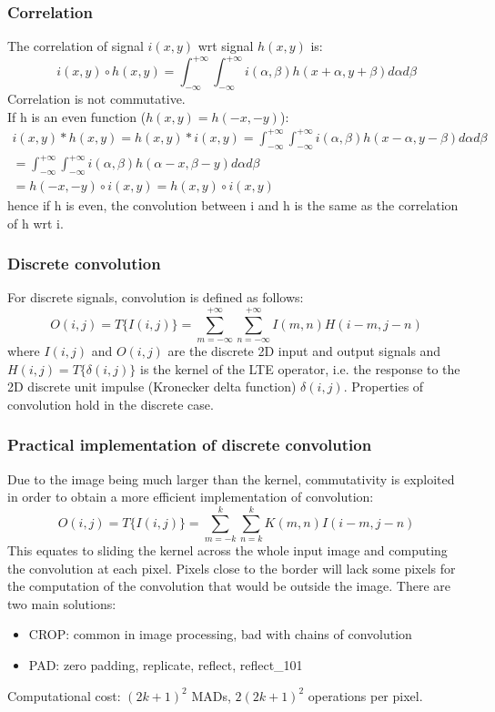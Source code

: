 \documentclass{article}
\begin{document}
\subsubsection{Correlation}
The correlation of signal $i(x,y)$ wrt signal $h(x,y)$ is:
$$i(x,y)\circ h(x,y) = \int_{-\infty}^{+\infty} \int_{-\infty}^{+\infty} i(\alpha,\beta)h(x+\alpha,y+\beta)d\alpha d\beta$$
Correlation is not commutative.\\
If h is an even function ($h(x,y)=h(-x,-y)$):
\begin{gather*}
    i(x,y)*h(x,y)=h(x,y)*i(x,y)=\int_{-\infty}^{+\infty} \int_{-\infty}^{+\infty} i(\alpha,\beta)h(x-\alpha,y-\beta)d\alpha d\beta\\
    = \int_{-\infty}^{+\infty} \int_{-\infty}^{+\infty} i(\alpha,\beta)h(\alpha-x,\beta-y)d\alpha d\beta\\
    = h(-x,-y)\circ i(x,y) = h(x,y) \circ i(x,y)
\end{gather*}
hence if h is even, the convolution between i and h is the same as the correlation of h wrt i.
\subsubsection{Discrete convolution}
For discrete signals, convolution is defined as follows:
\begin{equation}
    O(i,j)=T\{I(i,j)\}=\sum_{m=-\infty}^{+\infty} \sum_{n=-\infty}^{+\infty} I(m,n)H(i-m,j-n)
\end{equation}
where $I(i,j)$ and $O(i,j)$ are the discrete 2D input and output signals and $H(i,j)=T\{\delta(i,j)\}$ is the kernel of the LTE operator, i.e. the response to the 2D discrete unit impulse (Kronecker delta function) $\delta(i,j)$. Properties of convolution hold in the discrete case.
\subsubsection{Practical implementation of discrete convolution}
Due to the image being much larger than the kernel, commutativity is exploited in order to obtain a more efficient implementation of convolution:
\begin{equation}
    O(i,j)=T\{I(i,j)\}=\sum_{m=-k}^{k} \sum_{n=k}^{k} K(m,n)I(i-m,j-n)
\end{equation}
This equates to sliding the kernel across the whole input image and computing the convolution at each pixel. Pixels close to the border will lack some pixels for the computation of the convolution that would be outside the image. There are two main solutions:
\begin{itemize}
    \item CROP: common in image processing, bad with chains of convolution
    \item PAD: zero padding, replicate, reflect, reflect\_101
\end{itemize}
Computational cost: $(2k+1)^2$ MADs, $2(2k+1)^2$ operations per pixel.
\end{document}
